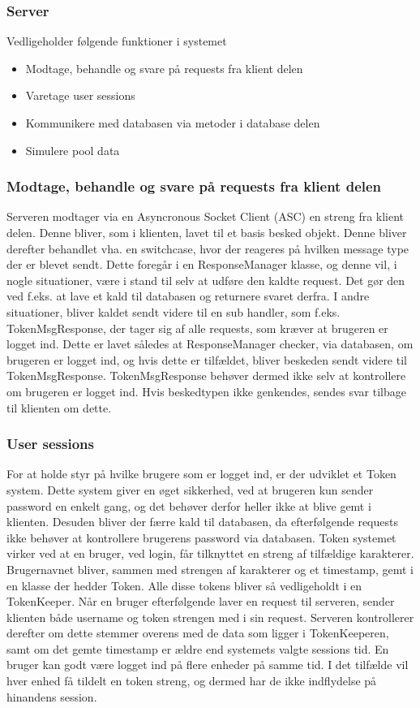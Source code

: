 \subsubsection{Server}
Vedligeholder følgende funktioner i systemet
\begin{itemize}
	\item Modtage, behandle og svare på requests fra klient delen
	\item Varetage user sessions
	\item Kommunikere med databasen via metoder i database delen
	\item Simulere pool data
\end{itemize}

\subsubsection{Modtage, behandle og svare på requests fra klient delen}
Serveren modtager via en Asyncronous Socket Client (ASC) en streng fra klient delen. Denne bliver, som i klienten, lavet til et basis besked objekt. Denne bliver derefter behandlet vha. en switchcase, hvor der reageres på hvilken message type der er blevet sendt. Dette foregår i en ResponseManager klasse, og denne vil, i nogle situationer, være i stand til selv at udføre den kaldte request. Det gør den ved f.eks. at lave et kald til databasen og returnere svaret derfra. 
I andre situationer, bliver kaldet sendt videre til en sub handler, som f.eks. TokenMsgResponse, der tager sig af alle requests, som kræver at brugeren er logget ind. Dette er lavet således at ResponseManager checker, via databasen, om brugeren er logget ind, og hvis dette er tilfældet, bliver beskeden sendt videre til TokenMsgResponse. TokenMsgResponse behøver dermed ikke selv at kontrollere om brugeren er logget ind.
Hvis beskedtypen ikke genkendes, sendes svar tilbage til klienten om dette.

\subsubsection{User sessions}
For at holde styr på hvilke brugere som er logget ind, er der udviklet et Token system. Dette system giver en øget sikkerhed, ved at brugeren kun sender password en enkelt gang, og det behøver derfor heller ikke at blive gemt i klienten. Desuden bliver der færre kald til databasen, da efterfølgende requests ikke behøver at kontrollere brugerens password via databasen.
Token systemet virker ved at en bruger, ved login, får tilknyttet en streng af tilfældige karakterer. Brugernavnet bliver, sammen med strengen af karakterer og et timestamp, gemt i en klasse der hedder Token. Alle disse tokens bliver så vedligeholdt i en TokenKeeper. Når en bruger efterfølgende laver en request til serveren, sender klienten både username og token strengen med i sin request. Serveren kontrollerer derefter om dette stemmer overens med de data som ligger i TokenKeeperen, samt om det gemte timestamp er ældre end systemets valgte sessions tid.
En bruger kan godt være logget ind på flere enheder på samme tid. I det tilfælde vil hver enhed få tildelt en token streng, og dermed har de ikke indflydelse på hinandens session.

